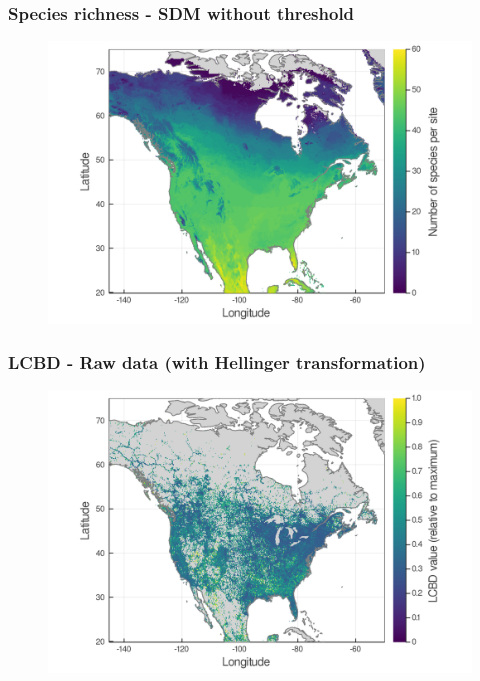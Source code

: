 \documentclass[10pt]{beamer}
\begin{document}
\begin{frame}
  \frametitle{Species richness - SDM without threshold}
  \begin{figure}
    \centering
    \hspace*{-0cm}\includegraphics[scale=0.17]{fig/03_sdm_richness.png}
  \end{figure}
\end{frame}

\begin{frame}
  \frametitle{LCBD - Raw data (with Hellinger transformation)}
  \begin{figure}
    \centering
    \hspace*{-0cm}\includegraphics[scale=0.17]{fig/05_raw_lcbd-transf.png}
  \end{figure}
\end{frame}
\end{document}
